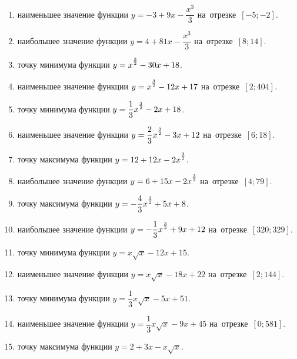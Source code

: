 \documentclass[a4paper,10pt]{article}
\begin{document}
\begin{enumerate}
\item {} наименьшее значение функции $y=-3 +9x-\dfrac{x^3}{3}$ на~отрезке~$\left[-5;-2\right]$.

\item {} наибольшее значение функции $y=4 +81x-\dfrac{x^3}{3}$ на~отрезке~$\left[8;14\right]$.

\item {} точку минимума функции $y=x\strut^{\frac{3}{2}} -30x+18$.

\item {} наименьшее значение функции $y=x\strut^{\frac{3}{2}} -12x+17$ на~отрезке~$\left[2;404\right]$.

\item {} точку минимума функции $y=\dfrac{1}{3}x\strut^{\frac{3}{2}} -2x+18$.

\item {} наименьшее значение функции $y=\dfrac{2}{3}x\strut^{\frac{3}{2}} -3x+12$ на~отрезке~$\left[6;18\right]$.

\item {} точку максимума функции $y=12+12x-2x\strut^{\frac{3}{2}}$.

\item {} наибольшее значение функции $y=6+15x-2x\strut^{\frac{3}{2}}$ на~отрезке~$\left[4;79\right]$.

\item {} точку максимума функции $y=-\dfrac{4}{3}x\strut^{\frac{3}{2}} +5x+8$.

\item {} наибольшее значение функции $y=-\dfrac{1}{3}x\strut^{\frac{3}{2}} +9x+12$ на~отрезке~$\left[320;329\right]$.

\item {} точку минимума функции $y=x\sqrt{x} -12x+15$.

\item {} наименьшее значение функции $y=x\sqrt{x} -18x+22$ на~отрезке~$\left[2;144\right]$.

\item {} точку минимума функции $y=\dfrac{1}{3}x\sqrt{x} -5x+51$.

\item {} наименьшее значение функции $y=\dfrac{1}{3}x\sqrt{x} -9x+45$ на~отрезке~$\left[0;581\right]$.

\item {} точку максимума функции $y=2+3x -x\sqrt{x}$.


\end{enumerate}
\end{document}
